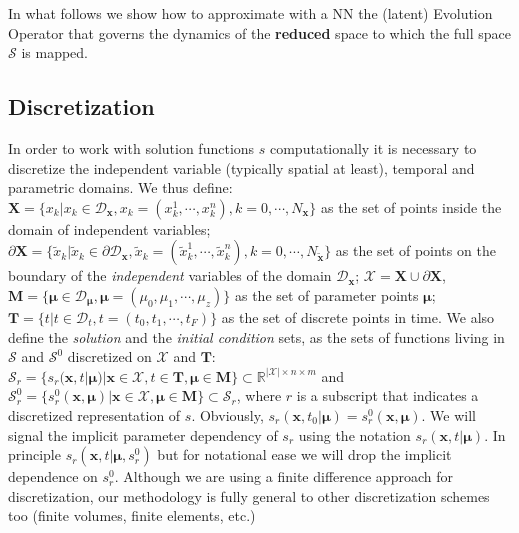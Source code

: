 In what follows we show how to approximate with a NN the (latent) Evolution Operator that governs the dynamics of the \textbf{reduced} space to which the full space $\mathcal{S}$ is mapped.
\subsection{Discretization}
In order to work with solution functions $s$ computationally it is necessary
to discretize the independent variable (typically spatial at least), temporal and parametric domains.  We thus define:
$\mathbf{X} = \{x_k|x_k\in \mathcal{D}_{\mathbf{x}}, x_k = (x_k^1,\cdots,x_k^n),k=0,\cdots,N_\mathbf{x}\}$ as the set of points inside the domain of independent variables; %
$\partial\mathbf{X} = \{\tilde{x}_k|\tilde{x}_k\in \partial\mathcal{D}_{\mathbf{x}}, \tilde{x}_k = (\tilde{x}_k^1,\cdots,\tilde{x}_k^n), k=0,\cdots,N_{\tilde{\mathbf{x}}}\}$ as the set of points on the boundary of the \textit{independent} variables of the domain $\mathcal{D}_{\mathbf{x}}$;
$\pmb{\mathcal{X}} = \mathbf{X}\cup\partial\mathbf{X}$,
$\pmb{M} = \{\pmb{\mu}\in\mathcal{D}_{\pmb{\mu}},\pmb{\mu}=(\mu_0,\mu_1,\cdots,\mu_z)\}$ as the set of parameter points $\pmb{\mu}$;
$\mathbf{T} = \{t|t\in\mathcal{D}_{t},t=(t_0,t_1,\cdots,t_{F})\}$  as the set of discrete points in time.
We also define the \textit{solution} and the \textit{initial condition} sets, as the sets of functions living in $\mathcal{S}$ and $\mathcal{S}^0$ discretized on $\pmb{\mathcal{X}}$ and $\pmb{T}$:
$\mathcal{S}_r=\{s_{r}(\mathbf{x},t|\pmb{\mu})|\mathbf{x}\in\pmb{\mathcal{X}}, t\in\mathbf{T}, \pmb{\mu}\in\pmb{M}\}\subset{\mathbb{R}^{|\pmb{\mathcal{X}}|\times n\times m}}$ and $\mathcal{S}^{0}_r=\{s^0_{r}(\mathbf{x},\pmb{\mu})|\mathbf{x}\in\pmb{\mathcal{X}},\pmb{\mu}\in\pmb{M}\}\subset\mathcal{S}_r$, where $r$ is a subscript that indicates a discretized representation of $s$. Obviously, $s_r(\mathbf{x},t_0|\pmb{\mu}) = s_r^0(\mathbf{x},\pmb{\mu})$. We will signal the implicit parameter dependency of $s_r$ using the notation $s_r(\mathbf{x},t|\pmb{\mu})$. In principle $s_r(\mathbf{x},t|\pmb{\mu},s_r^0)$ but for notational ease we will drop the implicit dependence on $s_r^0$. Although we are using a finite difference approach for discretization, our methodology is fully general to other discretization schemes too (finite volumes, finite elements, etc.)
